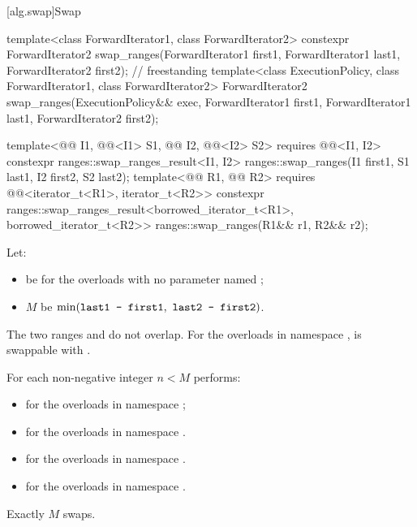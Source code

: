 [alg.swap]{Swap}

%
\begin{itemdecl}
template<class ForwardIterator1, class ForwardIterator2>
  constexpr ForwardIterator2
    swap_ranges(ForwardIterator1 first1, ForwardIterator1 last1,
                ForwardIterator2 first2);                               // freestanding
template<class ExecutionPolicy, class ForwardIterator1, class ForwardIterator2>
  ForwardIterator2
    swap_ranges(ExecutionPolicy&& exec,
                ForwardIterator1 first1, ForwardIterator1 last1,
                ForwardIterator2 first2);

template<@@ I1, @@<I1> S1, @@ I2, @@<I2> S2>
  requires @@<I1, I2>
  constexpr ranges::swap_ranges_result<I1, I2>
    ranges::swap_ranges(I1 first1, S1 last1, I2 first2, S2 last2);
template<@@ R1, @@ R2>
  requires @@<iterator_t<R1>, iterator_t<R2>>
  constexpr ranges::swap_ranges_result<borrowed_iterator_t<R1>, borrowed_iterator_t<R2>>
    ranges::swap_ranges(R1&& r1, R2&& r2);
\end{itemdecl}

\begin{itemdescr}
\pnum
Let:
\begin{itemize}
\item
   be 
  for the overloads with no parameter named ;
\item $M$ be $\min(\tcode{last1 - first1}, \ \tcode{last2 - first2})$.
\end{itemize}

\pnum
\expects
The two ranges  and 
do not overlap.
For the overloads in namespace ,
 is swappable with
.

\pnum
\effects
For each non-negative integer $n < M$ performs:
\begin{itemize}
\item
  for the overloads in namespace ;
\item
  for the overloads in namespace .
\end{itemize}

\pnum
\returns
\begin{itemize}
\item
  for the overloads in namespace .
\item
  for the overloads in namespace .
\end{itemize}

\pnum
\complexity
Exactly $M$ swaps.
\end{itemdescr}

